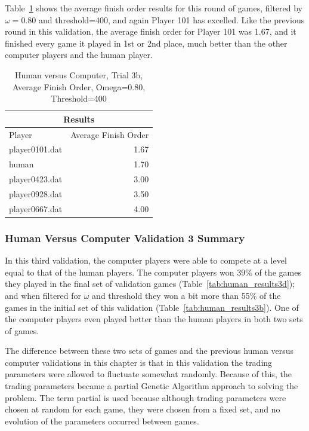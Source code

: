 Table~\ref{tab:human_results3e} shows the average finish order results for this
round of games, filtered by \(\omega=0.80\) and threshold=400, and again Player
101 has excelled. Like the previous round in this validation, the average finish
order for Player 101 was 1.67, and it finished every game it played in 1st or
2nd place, much better than the other computer players and the human player.

\begin{table}[htbp]
  \centering
  \caption{Human versus Computer, Trial 3b, Average Finish Order, Omega=0.80, Threshold=400}
    \begin{tabular}{lr}
    \toprule
    \multicolumn{2}{c}{Results}  \\
    \midrule
    Player & Average Finish Order \\
 \midrule
    \multicolumn{1}{l}{player0101.dat} & 1.67 \\
    \multicolumn{1}{l}{human} & 1.70 \\
    \multicolumn{1}{l}{player0423.dat} & 3.00 \\
    \multicolumn{1}{l}{player0928.dat} & 3.50 \\
    \multicolumn{1}{l}{player0667.dat} & 4.00 \\
    \bottomrule
    \end{tabular}%
  \label{tab:human_results3e}%
\end{table}%

\subsubsection{Human Versus Computer Validation 3 Summary}

In this third validation, the computer players were able to compete at a level
equal to that of the human players. The computer players won 39\% of the games
they played in the final set of validation games
(Table~\ref{tab:human_results3d}); and when filtered for \(\omega\) and
threshold they won a bit more than 55\% of the games in the initial set of this
validation (Table~\ref{tab:human_results3b}). One of the computer players even
played better than the human players in both two sets of games.

The difference between these two sets of games and the previous human versus
computer validations in this chapter is that in this validation the trading
parameters were allowed to fluctuate somewhat randomly. Because of this, the
trading parameters became a partial Genetic Algorithm approach to solving the
problem. The term partial is used because although trading parameters were
chosen at random for each game, they were chosen from a fixed set, and no
evolution of the parameters occurred between games.

